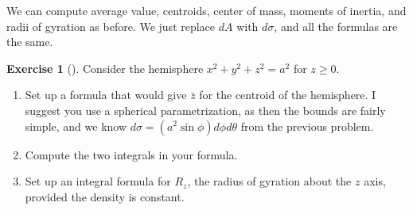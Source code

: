 \documentclass[10pt,]{book}
\theoremstyle{plain}
\theoremstyle{definition}
\theoremstyle{definition}
\theoremstyle{definition}
\theoremstyle{definition}
\newtheorem{exploration}[project]{Exercise}
\theoremstyle{definition}
\numberwithin{equation}{section}
\begin{document}
We can compute average value, centroids, center of mass, moments of inertia, and radii of gyration as before. We just replace \(dA\) with \(d\sigma\), and all the formulas are the same.%
\begin{exploration}[]\label{exploration-280}
Consider the hemisphere \(x^2+y^2+z^2=a^2\) for \(z\geq 0\).%
\begin{enumerate}[font=\bfseries,label=(\alph*),ref=\alph*]
\item\label{task-771} Set up a formula that would give \(\bar z\) for the centroid of the hemisphere. I suggest you use a spherical parametrization, as then the bounds are fairly simple, and we know \(d\sigma = (a^2\sin\phi) d\phi d\theta\) from the previous problem.%
\item\label{task-772} Compute the two integrals in your formula.%
\item\label{task-773} Set up an integral formula for \(R_z\), the radius of gyration about the \(z\) axis, provided the density is constant.%
\end{enumerate}
\end{exploration}
\typeout{************************************************}
\typeout{************************************************}
\end{document}
